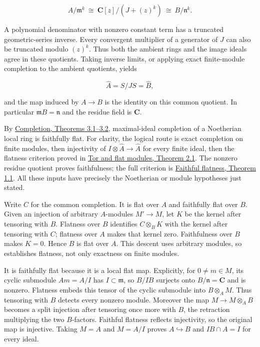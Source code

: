 \documentclass[11pt]{article}
\begin{document}
\[
A/\mathfrak m^k
\ \cong\ \mathbf C[z]/(J+(z)^k)
\ \cong\ B/\mathfrak n^k.
\]

A polynomial denominator with nonzero constant term has a truncated
geometric-series inverse. Every convergent multiplier of a generator of
\(J\) can also be truncated modulo \((z)^k\). Thus both the ambient
rings and the image ideals agree in these quotients. Taking inverse
limits, or applying exact finite-module completion to the ambient
quotients, yields

\[
\widehat A=S/JS=\widehat B,
\]

and the map induced by \(A\to B\) is the identity on this common
quotient. In particular \(\mathfrak mB=\mathfrak n\) and the residue
field is \(\mathbf C\).

By
\href{../AG-CA/AG-CA-19.html\#3-noetherian-exactness-tensoring-and-flatness}{Completion,
Theorems 3.1--3.2}, maximal-ideal completion of a Noetherian local ring
is faithfully flat. For clarity, the logical route is exact completion
on finite modules, then injectivity of
\(I\otimes\widehat A\to\widehat A\) for every finite ideal, then the
flatness criterion proved in
\href{../AG-CA/AG-CA-07.html\#2-the-ideal-and-tor-criteria}{Tor and flat
modules, Theorem 2.1}. The nonzero residue quotient proves faithfulness;
the full criterion is
\href{../AG-CA/AG-CA-08.html\#1-detecting-nonzero-modules}{Faithful
flatness, Theorem 1.1}. All these inputs have precisely the Noetherian
or module hypotheses just stated.

Write \(C\) for the common completion. It is flat over \(A\) and
faithfully flat over \(B\). Given an injection of arbitrary
\(A\)-modules \(M'\to M\), let \(K\) be the kernel after tensoring with
\(B\). Flatness over \(B\) identifies \(C\otimes_BK\) with the kernel
after tensoring with \(C\); flatness over \(A\) makes that kernel zero.
Faithfulness over \(B\) makes \(K=0\). Hence \(B\) is flat over \(A\).
This descent uses arbitrary modules, so establishes flatness, not only
exactness on finite modules.

It is faithfully flat because it is a local flat map. Explicitly, for
\(0\ne m\in M\), its cyclic submodule \(Am=A/I\) has
\(I\subset\mathfrak m\), so \(B/IB\) surjects onto
\(B/\mathfrak n=\mathbf C\) and is nonzero. Flatness embeds this tensor
of the cyclic submodule into \(B\otimes_AM\). Thus tensoring with \(B\)
detects every nonzero module. Moreover the map \(M\to M\otimes_AB\)
becomes a split injection after tensoring once more with \(B\), the
retraction multiplying the two \(B\)-factors. Faithful flatness reflects
injectivity, so the original map is injective. Taking \(M=A\) and
\(M=A/I\) proves \(A\hookrightarrow B\) and \(IB\cap A=I\) for every
ideal.
\end{document}
